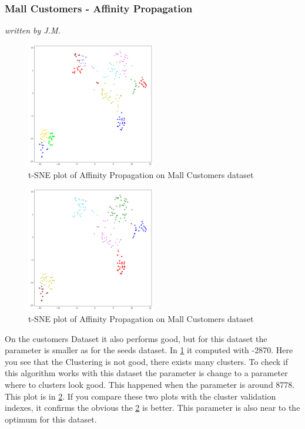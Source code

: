 \subsubsection{Mall Customers - Affinity Propagation}
\textit{written by J.M.}\\

 \begin{figure}[!ht]
 	\begin{center}
 		\includegraphics[width=0.5\textwidth]{images/af_mallcustomers2870.png}
 		\caption{t-SNE plot of Affinity Propagation on Mall Customers dataset}
 	\end{center}
 	\label{fig:af_mall1}
 \end{figure}
 
 \begin{figure}[!ht]
 		\begin{center}
 			\includegraphics[width=0.5\textwidth]{images/af_mallcustomers8778.png}
 			\caption{t-SNE plot of Affinity Propagation on Mall Customers dataset}
 		\end{center}
 		\label{fig:af_mall2}
 	\end{figure}
 
On the customers Dataset it also performs good, but for this dataset the parameter is smaller as for the seeds dataset. In \ref{fig:af_mall1} it computed with -2870. Here you see that the Clustering is not good, there exists many clusters. To check if this algorithm works with this dataset the parameter is change to a parameter where to clusters look good. This happened when the parameter is around 8778. This plot is in \ref{fig:af_mall2}. If you compare these two plots with the cluster validation indexes, it confirms the obvious the \ref{fig:af_mall2} is better. This parameter is also near to the optimum for this dataset. 

